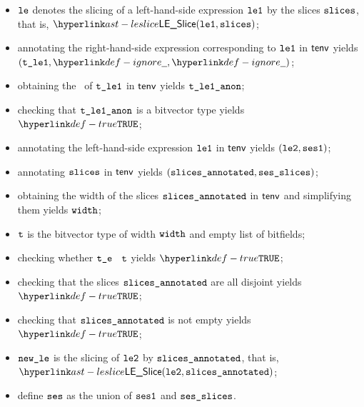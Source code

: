 \ProseParagraph
\AllApply
\begin{itemize}
  \item $\texttt{le}$ denotes the slicing of a left-hand-side expression $\texttt{le1}$ by the slices $\texttt{slices}$, that is, $\LESlice(\vleone, \slices)$;
  \item annotating the right-hand-side expression corresponding to $\texttt{le1}$ in $\textsf{tenv}$ yields \\
        $(\vtleone, \Ignore, \Ignore)$\ProseOrTypeError;
  \item obtaining the \underlyingtype\ of $\texttt{t\_le1}$ in $\textsf{tenv}$ yields $\texttt{t\_le1\_anon}$\ProseOrTypeError;
  \item checking that $\texttt{t\_le1\_anon}$ is a bitvector type yields $\True$\ProseTerminateAs{\UnexpectedType};
  \item annotating the left-hand-side expression $\texttt{le1}$ in $\textsf{tenv}$ yields $(\texttt{le2}, \texttt{ses1})$\ProseOrTypeError;
  \item annotating $\texttt{slices}$ in $\textsf{tenv}$ yields $(\texttt{slices\_annotated}, \texttt{ses\_slices})$\ProseOrTypeError;
  \item obtaining the width of the slices $\texttt{slices\_annotated}$ in $\textsf{tenv}$ and simplifying them yields $\texttt{width}$;
  \item $\texttt{t}$ is the bitvector type of width $\texttt{width}$ and empty list of bitfields;
  \item checking whether $\texttt{t\_e}$ \typesatisfies\ $\texttt{t}$ yields $\True$\ProseOrTypeError;
  \item checking that the slices $\texttt{slices\_annotated}$ are all disjoint yields $\True$\ProseOrTypeError;
  \item checking that $\texttt{slices\_annotated}$ is not empty yields $\True$\ProseTerminateAs{\BadSlices};
  \item $\texttt{new\_le}$ is the slicing of $\texttt{le2}$ by $\texttt{slices\_annotated}$, that is, $\LESlice(\vletwo, \slicesannotated)$;
  \item define $\texttt{ses}$ as the union of $\texttt{ses1}$ and $\texttt{ses\_slices}$.
\end{itemize}
\FormallyParagraph
